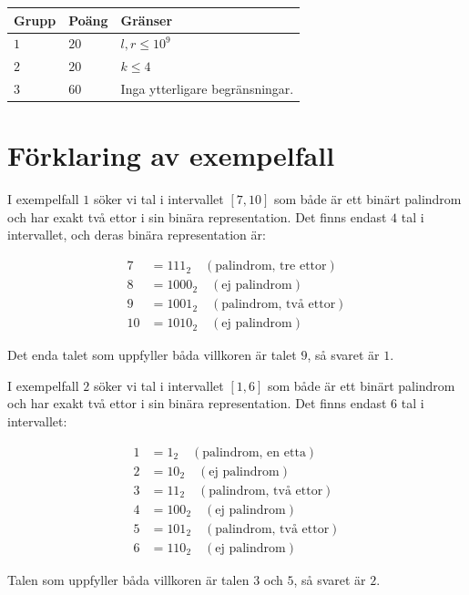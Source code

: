 \noindent
\begin{tabular}{| l | l | p{12cm} |}
  \hline
  \textbf{Grupp} & \textbf{Poäng} & \textbf{Gränser} \\ \hline
  $1$    & $20$       & $l,r \leq 10^9$ \\ \hline
  $2$    & $20$       & $k \leq 4$ \\ \hline
  $3$    & $60$       & Inga ytterligare begränsningar. \\ \hline
\end{tabular}

\section*{Förklaring av exempelfall}
I exempelfall $1$ söker vi tal i intervallet $[7, 10]$ som både är ett binärt palindrom och har exakt två ettor i sin binära representation.
Det finns endast $4$ tal i intervallet, och deras binära representation är:

\begin{align*}
7 &= 111_2 \quad (\text{palindrom, tre ettor}) \\
8 &= 1000_2 \quad (\text{ej palindrom}) \\
9 &= 1001_2 \quad (\text{palindrom, två ettor}) \\
10 &= 1010_2 \quad (\text{ej palindrom})
\end{align*}

Det enda talet som uppfyller båda villkoren är talet $9$, så svaret är $1$.

I exempelfall $2$ söker vi tal i intervallet $[1, 6]$ som både är ett binärt palindrom och har exakt två ettor i sin binära representation.
Det finns endast $6$ tal i intervallet:

\begin{align*}
1 &= 1_2 \quad (\text{palindrom, en etta}) \\
2 &= 10_2 \quad (\text{ej palindrom}) \\
3 &= 11_2 \quad (\text{palindrom, två ettor}) \\
4 &= 100_2 \quad (\text{ej palindrom}) \\
5 &= 101_2 \quad (\text{palindrom, två ettor}) \\
6 &= 110_2 \quad (\text{ej palindrom})
\end{align*}

Talen som uppfyller båda villkoren är talen $3$ och $5$, så svaret är $2$.
